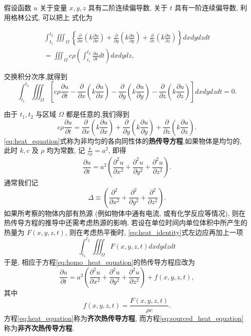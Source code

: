假设函数 $u$ 关于变量 $x, y, z$ 具有二阶连续偏导数, 关于 $t$ 具有一阶连续偏导数, 利用格林公式, 可以把上 式化为

\begin{equation}
\begin{gathered}
\int_{t_1}^{t_2} \iiint_{\Omega}\left\{\frac{\partial}{\partial x}\left(k \frac{\partial u}{\partial x}\right)+\frac{\partial}{\partial y}\left(k \frac{\partial u}{\partial y}\right)+\frac{\partial}{\partial z}\left(k \frac{\partial u}{\partial z}\right)\right\} d x d y d z d t \\
=\iiint_{\Omega} c \rho\left(\int_{t_1}^{t_2} \frac{\partial u}{\partial t} d t\right) d x d y d z,
\label{eq:heat_identity}
\end{gathered}
\end{equation}

交换积分次序,就得到
$$
\int_{t_1}^{t_2} \iiint_{\Omega}\left[c \rho \frac{\partial u}{\partial t}-\frac{\partial}{\partial x}
\left(k \frac{\partial u}{\partial x}\right)-\frac{\partial}{\partial y}
\left(k \frac{\partial u}{\partial y}\right)-\frac{\partial}{\partial z}
\left(k \frac{\partial u}{\partial z}\right)\right] d x d y d z d t=0 .
$$

由于 $t_1, t_2$ 与区域 $\Omega$ 都是任意的,我们得到
\begin{equation}
c \rho \frac{\partial u}{\partial t}=\frac{\partial}{\partial x}
\left(k \frac{\partial u}{\partial x}\right)+\frac{\partial}{\partial y}
\left(k \frac{\partial u}{\partial y}\right)+\frac{\partial}{\partial z}
\left(k \frac{\partial u}{\partial z}\right) .
\label{eq:heat_equation}
\end{equation}
\ref{eq:heat_equation}式称为非均匀的各向同性体的\textbf{热传导方程}.如果物体是均匀的, 
此时 $k, c$ 及 $\rho$ 均为常数, 记 $\frac{k}{c \rho}=a^2$, 即得
\begin{equation}
\frac{\partial u}{\partial t}=a^2\left(\frac{\partial^2 u}{\partial x^2}
+\frac{\partial^2 u}{\partial y^2}+\frac{\partial^2 u}{\partial z^2}\right) .
\label{eq:homo_heat_equation}
\end{equation}
通常我们记
\begin{equation}
   \Delta \equiv \left(\frac{\partial^2 }{\partial x^2}
+\frac{\partial^2 }{\partial y^2}+\frac{\partial^2 }{\partial z^2}\right) .
    \label{eq:Delta}
\end{equation}
如果所考察的物体内部有热源 (例如物体中通有电流, 或有化学反应等情况), 则在热传导方程的推导中还需考虑热源的影响.
若设在单位时间内单位体积中所产生的热量为 $F(x, y, z, t)$, 则在考虑热平衡时, \ref{eq:heat_identity}式左边应再加上一项
$$
\int_{t_1}^{t_2} \iiint_{\Omega} F(x, y, z, t) d x d y d z d t
$$
于是, 相应于方程\ref{eq:homo_heat_equation}的热传导方程应改为
\begin{equation}
    \frac{\partial u}{\partial t}=a^2\left(\frac{\partial^2 u}{\partial x^2}+
    \frac{\partial^2 u}{\partial y^2}+\frac{\partial^2 u}{\partial z^2}\right)+f(x, y, z, t),
    \label{eq:sourced_heat_equation}
\end{equation}
其中
$$
f(x, y, z, t)=\frac{F(x, y, z, t)}{\rho c} .
$$
方程\ref{eq:heat_equation}称为\textbf{齐次热传导方程}, 而方程\ref{eq:sourced_heat_equation} 称为\textbf{非齐次热传导方程}.




